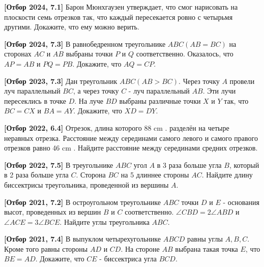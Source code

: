 \textbf{[Отбор 2024, 7.1]}
Барон Мюнхгаузен утверждает, что смог нарисовать на плоскости семь отрезков так, что каждый пересекается ровно с четырьмя другими. Докажите, что ему можно верить.

\textbf{[Отбор 2024, 7.3]} 
В равнобедренном треугольнике $A B C(A B=B C)$ на сторонах $A C$ и $A B$ выбраны точки $P$ и $Q$ соответственно. Оказалось, что $A P=A B$ и $P Q=P B$. Докажите, что $A Q=C P$.

\textbf{[Отбор 2023, 7.3]}
Дан треугольник $A B C(A B>B C)$. Через точку $A$ провели луч параллельный $B C$, а через точку $C$ - луч параллельный $A B$. Эти лучи пересеклись в точке $D$. На луче $B D$ выбраны различные точки $X$ и $Y$ так, что $B C=C X$ и $B A=A Y$. Докажите, что $X D=D Y$.

\textbf{[Отбор 2022, 6.4]}
Отрезок, длина которого 88 cm . разделён на четыре неравных отрезка. Расстояние между серединами самого левого и самого правого отрезков равно 46 cm . Найдите расстояние между серединами средних отрезков.

\textbf{[Отбор 2022, 7.5]}
В треугольнике $A B C$ угол $A$ в 3 раза больше угла $B$, который в 2 раза больше угла $C$. Сторона $B C$ на 5 длиннее стороны $A C$. Найдите длину биссектрисы треугольника, проведенной из вершины $A$.

\textbf{[Отбор 2021, 7.2]}
В остроугольном треугольнике $A B C$ точки $D$ и $E$ - основания высот, проведенных из вершин $B$ и $C$ соответственно. $\angle C B D=2 \angle A B D$ и $\angle A C E=3 \angle B C E$. Найдите углы треугольника $A B C$.

\textbf{[Отбор 2021, 7.4]}
В выпуклом четырехугольнике $A B C D$ равны углы $A, B, C$. Кроме того равны стороны $A D$ и $C D$. На стороне $A B$ выбрана такая точка $E$, что $B E=A D$. Докажите, что $C E$ - биссектриса угла $B C D$.